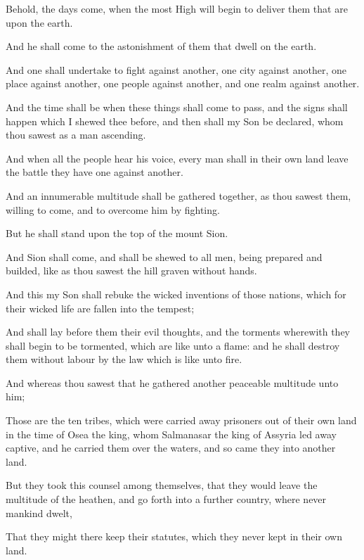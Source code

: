 {\par }{\PP {}Behold, the days come, when the most High will begin to deliver them that are upon the earth.
\par }{\PP {}And he shall come to the astonishment of them that dwell on the earth.
\par }{\PP {}And one shall undertake to fight against another, one city against another, one place against another, one people against another, and one realm against another.
\par }{\PP {}And the time shall be when these things shall come to pass, and the signs shall happen which I shewed thee before, and then shall my Son be declared, whom thou sawest as a man ascending.
\par }{\PP {}And when all the people hear his voice, every man shall in their own land leave the battle they have one against another.
\par }{\PP {}And an innumerable multitude shall be gathered together, as thou sawest them, willing to come, and to overcome him by fighting.
\par }{\PP {}But he shall stand upon the top of the mount Sion.
\par }{\PP {}And Sion shall come, and shall be shewed to all men, being prepared and builded, like as thou sawest the hill graven without hands.
\par }{\PP {}And this my Son shall rebuke the wicked inventions of those nations, which for their wicked life are fallen into the tempest;
\par }{\PP {}And shall lay before them their evil thoughts, and the torments wherewith they shall begin to be tormented, which are like unto a flame: and he shall destroy them without labour by the law which is like unto fire.
\par }{\PP {}And whereas thou sawest that he gathered another peaceable multitude unto him;
\par }{\PP {}Those are the ten tribes, which were carried away prisoners out of their own land in the time of Osea the king, whom Salmanasar the king of Assyria led away captive, and he carried them over the waters, and so came they into another land.
\par }{\PP {}But they took this counsel among themselves, that they would leave the multitude of the heathen, and go forth into a further country, where never mankind dwelt,
\par }{\PP {}That they might there keep their statutes, which they never kept in their own land.
}
